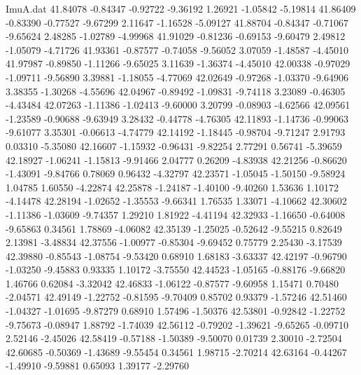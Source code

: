 \begin{filecontents}{ImuA.dat}
  41.84078   -0.84347   -0.92722   -9.36192    1.26921   -1.05842   -5.19814
  41.86409   -0.83390   -0.77527   -9.67299    2.11647   -1.16528   -5.09127
  41.88704   -0.84347   -0.71067   -9.65624    2.48285   -1.02789   -4.99968
  41.91029   -0.81236   -0.69153   -9.60479    2.49812   -1.05079   -4.71726
  41.93361   -0.87577   -0.74058   -9.56052    3.07059   -1.48587   -4.45010
  41.97987   -0.89850   -1.11266   -9.65025    3.11639   -1.36374   -4.45010
  42.00338   -0.97029   -1.09711   -9.56890    3.39881   -1.18055   -4.77069
  42.02649   -0.97268   -1.03370   -9.64906    3.38355   -1.30268   -4.55696
  42.04967   -0.89492   -1.09831   -9.74118    3.23089   -0.46305   -4.43484
  42.07263   -1.11386   -1.02413   -9.60000    3.20799   -0.08903   -4.62566
  42.09561   -1.23589   -0.90688   -9.63949    3.28432   -0.44778   -4.76305
  42.11893   -1.14736   -0.99063   -9.61077    3.35301   -0.06613   -4.74779
  42.14192   -1.18445   -0.98704   -9.71247    2.91793    0.03310   -5.35080
  42.16607   -1.15932   -0.96431   -9.82254    2.77291    0.56741   -5.39659
  42.18927   -1.06241   -1.15813   -9.91466    2.04777    0.26209   -4.83938
  42.21256   -0.86620   -1.43091   -9.84766    0.78069    0.96432   -4.32797
  42.23571   -1.05045   -1.50150   -9.58924    1.04785    1.60550   -4.22874
  42.25878   -1.24187   -1.40100   -9.40260    1.53636    1.10172   -4.14478
  42.28194   -1.02652   -1.35553   -9.66341    1.76535    1.33071   -4.10662
  42.30602   -1.11386   -1.03609   -9.74357    1.29210    1.81922   -4.41194
  42.32933   -1.16650   -0.64008   -9.65863    0.34561    1.78869   -4.06082
  42.35139   -1.25025   -0.52642   -9.55215    0.82649    2.13981   -3.48834
  42.37556   -1.00977   -0.85304   -9.69452    0.75779    2.25430   -3.17539
  42.39880   -0.85543   -1.08754   -9.53420    0.68910    1.68183   -3.63337
  42.42197   -0.96790   -1.03250   -9.45883    0.93335    1.10172   -3.75550
  42.44523   -1.05165   -0.88176   -9.66820    1.46766    0.62084   -3.32042
  42.46833   -1.06122   -0.87577   -9.60958    1.15471    0.70480   -2.04571
  42.49149   -1.22752   -0.81595   -9.70409    0.85702    0.93379   -1.57246
  42.51460   -1.04327   -1.01695   -9.87279    0.68910    1.57496   -1.50376
  42.53801   -0.92842   -1.22752   -9.75673   -0.08947    1.88792   -1.74039
  42.56112   -0.79202   -1.39621   -9.65265   -0.09710    2.52146   -2.45026
  42.58419   -0.57188   -1.50389   -9.50070    0.01739    2.30010   -2.72504
  42.60685   -0.50369   -1.43689   -9.55454    0.34561    1.98715   -2.70214
  42.63164   -0.44267   -1.49910   -9.59881    0.65093    1.39177   -2.29760

\end{filecontents}

